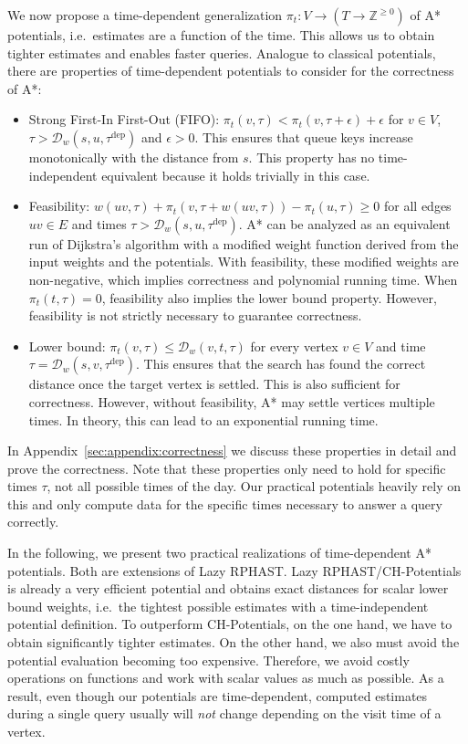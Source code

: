 \documentclass[a4paper,UKenglish,cleveref, autoref, thm-restate]{lipics-v2021}
\newcommand*{\dist}{\mathcal{D}}
\newcommand*{\tdep}{\tau^{\operatorname{dep}}}
\begin{document}
We now propose a time-dependent generalization $\pi_t : V \to (T \to \mathbb{Z}^{\geq 0})$ of A* potentials, i.e.\ estimates are a function of the time.
This allows us to obtain tighter estimates and enables faster queries.
Analogue to classical potentials, there are properties of time-dependent potentials to consider for the correctness of A*:
\begin{itemize}
  \item Strong First-In First-Out (FIFO): $\pi_t(v, \tau) < \pi_t(v, \tau + \epsilon) + \epsilon$ for $v \in V$, $\tau > \dist_w(s,u,\tdep)$ and $\epsilon > 0$.
        This ensures that queue keys increase monotonically with the distance from $s$.
        This property has no time-independent equivalent because it holds trivially in this case.
  \item Feasibility: $w(uv, \tau) + \pi_t(v, \tau + w(uv, \tau)) - \pi_t(u, \tau) \geq 0$ for all edges $uv \in E$ and times $\tau > \dist_w(s,u,\tdep)$.
        A* can be analyzed as an equivalent run of Dijkstra's algorithm with a modified weight function derived from the input weights and the potentials.
        With feasibility, these modified weights are non-negative, which implies correctness and polynomial running time.
        When $\pi_t(t, \tau) = 0$, feasibility also implies the lower bound property.
        However, feasibility is not strictly necessary to guarantee correctness.
  \item Lower bound: $\pi_t(v, \tau) \leq \dist_w(v,t,\tau)$ for every vertex $v \in V$ and time $\tau = \dist_w(s,v,\tdep)$.
        This ensures that the search has found the correct distance once the target vertex is settled.
        This is also sufficient for correctness.
        However, without feasibility, A* may settle vertices multiple times.
        In theory, this can lead to an exponential running time.
\end{itemize}

In Appendix~\ref{sec:appendix:correctness} we discuss these properties in detail and prove the correctness.
Note that these properties only need to hold for specific times $\tau$, not all possible times of the day.
Our practical potentials heavily rely on this and only compute data for the specific times necessary to answer a query correctly.

In the following, we present two practical realizations of time-dependent A* potentials.
Both are extensions of Lazy RPHAST.
Lazy RPHAST/CH-Potentials is already a very efficient potential and obtains exact distances for scalar lower bound weights, i.e.\ the tightest possible estimates with a time-independent potential definition.
To outperform CH-Potentials, on the one hand, we have to obtain significantly tighter estimates.
On the other hand, we also must avoid the potential evaluation becoming too expensive.
Therefore, we avoid costly operations on functions and work with scalar values as much as possible.
As a result, even though our potentials are time-dependent, computed estimates during a single query usually will \emph{not} change depending on the visit time of a vertex.
\end{document}
